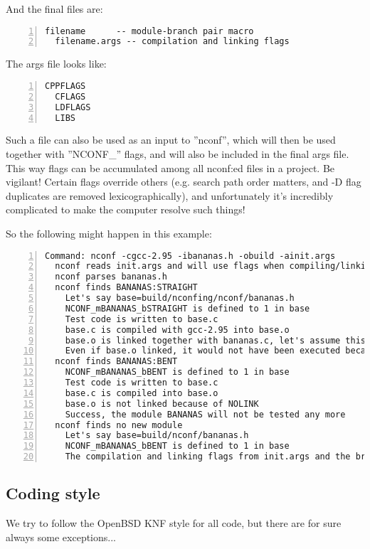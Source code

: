 \documentclass{article}
\begin{document}
And the final files are:
\begin{Verbatim}[frame=single,numbers=left]
  filename      -- module-branch pair macro
  filename.args -- compilation and linking flags
\end{Verbatim}

The args file looks like:
\begin{Verbatim}[frame=single,numbers=left]
  CPPFLAGS
  CFLAGS
  LDFLAGS
  LIBS
\end{Verbatim}
Such a file can also be used as an input to ''nconf'', which will then be used
together with ''NCONF\_'' flags, and will also be included in the final args
file. This way flags can be accumulated among all nconf:ed files in a project.
Be vigilant! Certain flags override others (e.g. search path order matters,
and -D flag duplicates are removed lexicographically), and unfortunately it's
incredibly complicated to make the computer resolve such things!

So the following might happen in this example:
\begin{Verbatim}[frame=single,numbers=left]
  Command: nconf -cgcc-2.95 -ibananas.h -obuild -ainit.args
  nconf reads init.args and will use flags when compiling/linking
  nconf parses bananas.h
  nconf finds BANANAS:STRAIGHT
    Let's say base=build/nconfing/nconf/bananas.h
    NCONF_mBANANAS_bSTRAIGHT is defined to 1 in base
    Test code is written to base.c
    base.c is compiled with gcc-2.95 into base.o
    base.o is linked together with bananas.c, let's assume this fails
    Even if base.o linked, it would not have been executed because of NOEXEC
  nconf finds BANANAS:BENT
    NCONF_mBANANAS_bBENT is defined to 1 in base
    Test code is written to base.c
    base.c is compiled into base.o
    base.o is not linked because of NOLINK
    Success, the module BANANAS will not be tested any more
  nconf finds no new module
    Let's say base=build/nconf/bananas.h
    NCONF_mBANANAS_bBENT is defined to 1 in base
    The compilation and linking flags from init.args and the branch are written to base.args
\end{Verbatim}



\subsection{Coding style}

We try to follow the OpenBSD KNF style for all code, but there are for sure
always some exceptions...
\end{document}
